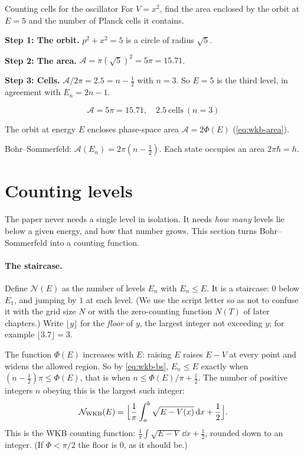 \begin{sample}{Counting cells for the oscillator}
For $V=x^2$, find the area enclosed by the orbit at $E=5$ and the number of Planck cells it contains.

\textbf{Step 1: The orbit.} $p^2+x^2=5$ is a circle of radius $\sqrt5$.

\textbf{Step 2: The area.} $\mathcal A=\pi(\sqrt5)^2=5\pi=15.71$.

\textbf{Step 3: Cells.} $\mathcal A/2\pi=2.5=n-\frac12$ with $n=3$. So $E=5$ is the third level, in agreement with $E_n=2n-1$.

\[
\boxed{\mathcal A=5\pi=15.71,\quad 2.5\ \text{cells}\ (n=3)}
\]
\end{sample}

\begin{keyideas}
\item The orbit at energy $E$ encloses phase-space area $\mathcal A=2\Phi(E)$ (\cref{eq:wkb-area}).
\item Bohr--Sommerfeld: $\mathcal A(E_n)=2\pi(n-\frac12)$. Each state occupies an area $2\pi\hbar=h$.
\end{keyideas}

\section{Counting levels}\label{sec:wkb-counting}

The paper never needs a single level in isolation. It needs \emph{how many} levels lie below a given energy, and how that number grows. This section turns Bohr--Sommerfeld into a counting function.

\paragraph{The staircase.} Define $\mathcal N(E)$ as the number of levels $E_n$ with $E_n\le E$. It is a staircase: $0$ below $E_1$, and jumping by $1$ at each level. (We use the script letter so as not to confuse it with the grid size $N$ or with the zero-counting function $N(T)$ of later chapters.) Write $\lfloor y\rfloor$ for the \emph{floor} of $y$, the largest integer not exceeding $y$; for example $\lfloor 3.7\rfloor=3$.

The function $\Phi(E)$ increases with $E$: raising $E$ raises $E-V$ at every point and widens the allowed region. So by \cref{eq:wkb-bs}, $E_n\le E$ exactly when $(n-\frac12)\pi\le\Phi(E)$, that is when $n\le\Phi(E)/\pi+\frac12$. The number of positive integers $n$ obeying this is the largest such integer:
\begin{equation}
\mathcal N_{\rm WKB}(E)=\Bigl\lfloor\frac{1}{\pi}\int_{a}^{b}\sqrt{E-V(x)}\,\mathrm{d} x+\frac12\Bigr\rfloor.
\label{eq:wkb-stair}
\end{equation}
This is the WKB counting function: $\frac1\pi\int\sqrt{E-V}\,\dd x+\frac12$, rounded down to an integer. (If $\Phi<\pi/2$ the floor is $0$, as it should be.)

